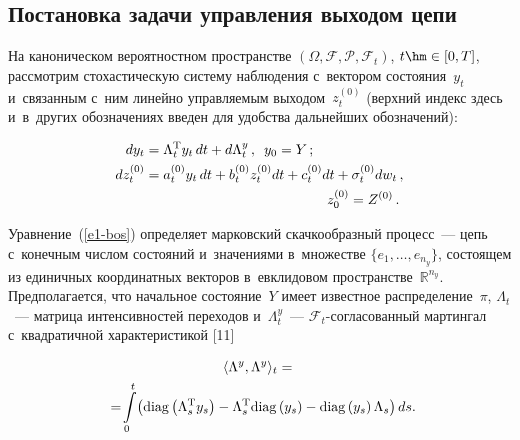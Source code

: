 \begin{multicols}{2}
\vspace*{-8pt}
     
\section{Постановка задачи управления выходом цепи}

\vspace*{-2pt}

     На каноническом вероятностном пространстве $(\Omega, 
\mathcal{F},\mathcal{P}, \mathcal{F}_t)$, $t\hm\in [0,T]$, рассмотрим 
стохастическую систему наблюдения с~вектором состояния~$y_t$ 
и~связанным с~ним линейно управляемым выходом~$z_t^{(0)}$ (верхний 
индекс здесь и~в~других обозначениях введен для удобства дальнейших 
обозначений):

\vspace*{-2pt}

\noindent
     \begin{align}
     dy_t&= \Lambda_t^{\mathrm{T}} y_t\, dt+d\Lambda_t^y\,,\enskip y_0=Y\,;  
\label{e1-bos} \\
     dz_t^{(0)} &= a_t^{(0)} y_t\,dt+b_t^{(0)} z_t^{(0)}dt+c_t^{(0)}dt 
+\sigma_t^{(0)}dw_t\,,\notag\\
&\hspace*{46mm}z_0^{(0)}=Z^{(0)}\,.
     \label{e2-bos}
     \end{align}
     
     \vspace*{-2pt}
     
     Уравнение~(\ref{e1-bos}) определяет марковский скачкообразный 
процесс~--- цепь с~конечным числом состояний и~значениями в~множестве 
     $\{ e_1, \ldots , e_{n_y}\}$, состоящем из единичных координатных 
векторов в~евклидовом пространстве~$\mathbb{R}^{n_y}$. Предполагается, 
что начальное состояние~$Y$ имеет известное распределение~$\pi$, 
$\Lambda_t$~--- матрица интенсивностей переходов и~$\Lambda_t^y$~---  
$\mathcal{F}_t$-со\-гла\-со\-ван\-ный мартингал с~квадратичной 
характеристикой [11]

\vspace*{-4pt}

\noindent
    \begin{multline*}
     \langle \Lambda^y, \Lambda^y\rangle_t ={}\\
     {}=\!\int\limits_0^t \!\left(\mathrm{diag}\left( 
\Lambda_s^{\mathrm{T}} y_s\right) -\Lambda_s^{\mathrm{T}} \mathrm{diag} \left( y_s\right) -\mathrm{diag}\left( y_s\right) 
\Lambda_s \right) ds.\hspace*{-2.25598pt}
   \end{multline*}
   

\end{multicols}

